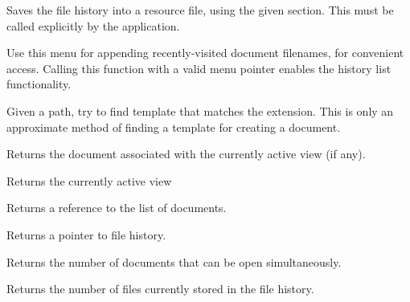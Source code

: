 
Saves the file history into a resource file, using the given section. This must be called
explicitly by the application.



Use this menu for appending recently-visited document filenames, for convenient
access. Calling this function with a valid menu pointer enables the history
list functionality.



Given a path, try to find template that matches the extension. This is only
an approximate method of finding a template for creating a document.



Returns the document associated with the currently active view (if any).



Returns the currently active view 



Returns a reference to the list of documents.



Returns a pointer to file history.



Returns the number of documents that can be open simultaneously.



Returns the number of files currently stored in the file history.


